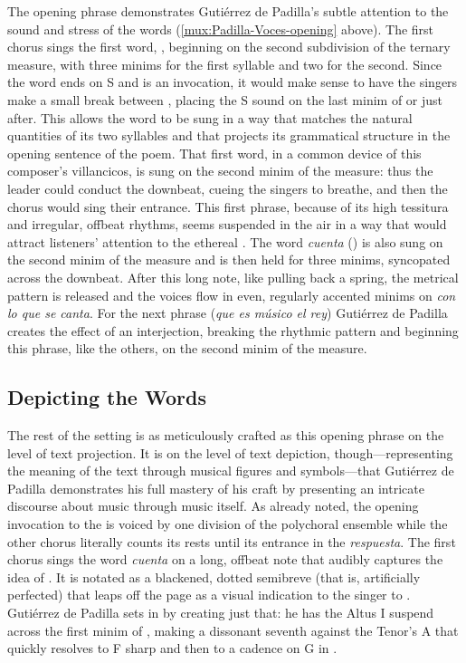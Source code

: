 The opening phrase demonstrates Gutiérrez de Padilla's subtle attention to the
sound and stress of the words (\cref{mux:Padilla-Voces-opening} above).
The first chorus sings the first word, , beginning on the second
subdivision of the ternary measure, with three minims for the first syllable and
two for the second.
Since the word ends on S and is an invocation, it would make sense to have the
singers make a small break between , placing the S sound on the
last minim of  or just after.
This allows the word to be sung in a way that matches the natural quantities of
its two syllables and that projects its grammatical structure in the opening
sentence of the poem.
That first word, in a common device of this composer's villancicos, is sung on
the second minim of the measure: thus the leader could conduct the downbeat,
cueing the singers to breathe, and then the chorus would sing their entrance. 
This first phrase, because of its high tessitura and irregular, offbeat rhythms,
seems suspended in the air in a way that would attract listeners' attention to
the ethereal . 
The word \emph{cuenta} () is also sung on the second minim of the
measure and is then held for three minims, syncopated across the downbeat.
After this long note, like pulling back a spring, the metrical pattern is
released and the voices flow in even, regularly accented minims on \emph{con lo
que se canta}.
For the next phrase (\emph{que es músico el rey}) Gutiérrez de Padilla creates
the effect of an interjection, breaking the rhythmic pattern and beginning this
phrase, like the others, on the second minim of the measure.


\subsection{Depicting the Words}

The rest of the setting is as meticulously crafted as this opening phrase on the
level of text projection.
It is on the level of text depiction, though---representing the meaning of the text
through musical figures and symbols---that Gutiérrez de Padilla demonstrates his
full mastery of his craft by presenting an intricate discourse about music
through music itself.
As already noted, the opening invocation to the  is voiced by one division of the polychoral
ensemble while the other chorus literally counts its rests until its entrance in
the \emph{respuesta}.
The first chorus sings the word \emph{cuenta} on a long, offbeat note that
audibly captures the idea of .
It is notated as a blackened, dotted semibreve (that is, artificially perfected)
that leaps off the page as a visual indication to the singer to .
Gutiérrez de Padilla sets  in 
by creating just that: he has the Altus I suspend across the first minim of
, making a dissonant seventh against the Tenor's A that quickly
resolves to F sharp and then to a cadence on G in .

